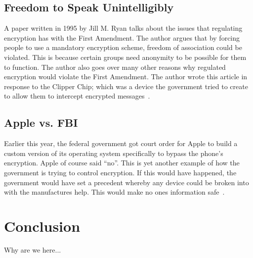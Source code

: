 \documentclass[12pt,a4paper,titlepage]{article}
\begin{document}
\subsection{Freedom to Speak Unintelligibly}
A paper written in 1995 by Jill M. Ryan talks about the issues that regulating 
encryption has with the First Amendment. The author argues that by forcing 
people to use a mandatory encryption scheme, freedom of association could be 
violated. This is because certain groups need anonymity to be possible for them 
to function. The author also goes over many other reasons why regulated 
encryption would violate the First Amendment. The author wrote this article in 
response to the Clipper Chip; which was a device the government tried to create 
to allow them to intercept encrypted messages~\cite{ryan1995freedom}.

\subsection{Apple vs. FBI}
Earlier this year, the federal government got court order for Apple to build 
a custom version of its operating system specifically to bypass the phone's 
encryption. Apple of course said ``no''. This is yet another example of how the 
government is trying to control encryption. If this would have happened, the 
government would have set a precedent whereby any device could be broken into 
with the manufactures help. This would make no ones information 
safe~\cite{herman2016fbi}.

\section{Conclusion}
Why are we here...

\newpage

\appendix

\newpage
\printbibliography[
heading=bibintoc,
title={Resources}
]
\end{document}
